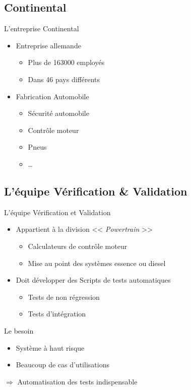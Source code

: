 \documentclass{beamer}
\begin{document}
\subsection{Continental}
\begin{frame}{L'entreprise Continental}
	\begin{itemize}
		\item Entreprise allemande
			\begin{itemize}
				\item Plus de 163000 employés
				\item Dans 46 pays différents
			\end{itemize}
			\vfill
			\pause
		\item Fabrication Automobile
			\begin{itemize}
				\item Sécurité automobile 
				\item Contrôle moteur
				\item Pneus
				\item \ldots
			\end{itemize}
	\end{itemize}
\end{frame}
\subsection{L'\'equipe V\'erification \& Validation}
\begin{frame}{L'\'equipe V\'erification et Validation}
	\begin{itemize}
		\item Appartient à la division << \textit{Powertrain} >>
			\begin{itemize}
				\item Calculateurs de contrôle moteur
				\item Mise au point des systèmes essence ou diesel
			\end{itemize}
	\end{itemize}
	\pause
	\begin{itemize}
		\item Doit développer des Scripts de tests automatiques
			\begin{itemize}
				\item Tests de non régression
				\item Tests d'intégration
			\end{itemize}
	\end{itemize}
	\pause
	\vfill
	\begin{block}{Le besoin}
		\begin{itemize}
			\item Système à haut risque 
			\item Beaucoup de cas d'utilisations 
		\end{itemize}
	\end{block}
	\pause
	\hspace{30px} $\Rightarrow$ Automatisation des tests indispensable
\end{frame}
\end{document}

